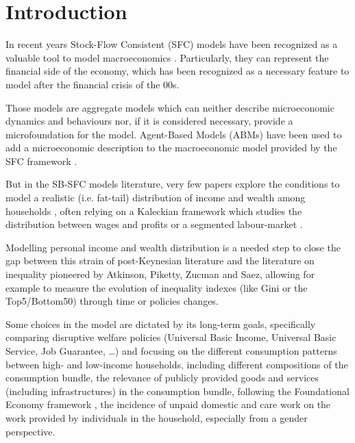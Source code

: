 \documentclass[a4paper, headings=standardclasses]{scrartcl}
\begin{document}
\section{Introduction}

In recent years Stock-Flow Consistent (SFC) models have been recognized as a valuable tool to model macroeconomics \parencite{nikiforos2017}. Particularly, they can represent the financial side of the economy, which has been recognized as a necessary feature to model after the financial crisis of the 00s.

Those models are aggregate models which can neither describe microeconomic dynamics and behaviours nor, if it is considered necessary, provide a microfoundation for the model.
Agent-Based Models (ABMs) have been used to add a microeconomic description to the macroeconomic model provided by the SFC framework \parencite{caverzasi2018,dosi2019}.

But in the SB-SFC models literature, very few papers explore the conditions to model a realistic (i.e. fat-tail) distribution of income and wealth among households \parencite[e.g.][]{dafermos2015,kinsella2011}, often relying on a Kaleckian framework which studies the distribution between wages and profits \parencite[e.g.][]{dosi2013a} or a segmented labour-market \parencite[e.g.][]{caiani2019a}.

Modelling personal income and wealth distribution is a needed step to close the gap between this strain of post-Keynesian literature and the literature on inequality pioneered by Atkinson, Piketty, Zucman and Saez, allowing for example to measure the evolution of inequality indexes (like Gini or the Top5/Bottom50) through time or policies changes.

Some choices in the model are dictated by its long-term goals, specifically comparing disruptive welfare policies (Universal Basic Income, Universal Basic Service, Job Guarantee, \dots) and focusing on the different consumption patterns between high- and low-income households, including different compositions of the consumption bundle, the relevance of publicly provided goods and services (including infrastructures) in the consumption bundle, following the Foundational Economy framework \parencite{arcidiacono2018}, the incidence of unpaid domestic and care work on the work provided by individuals in the household, especially from a gender perspective.
\end{document}
